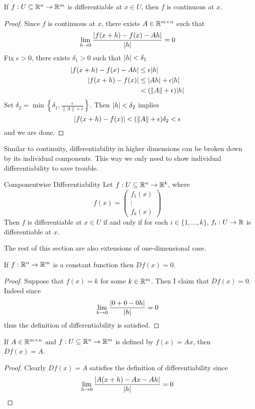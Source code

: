 \documentclass[a4paper]{article}
\begin{document}
\begin{prp}{}{} If $f:U\subseteq\mathbb{R}^n\to\mathbb{R}^m$ is differentiable at $x\in U$, then $f$ is continuous at $x$. \tcbline
\begin{proof}
Since $f$ is continuous at $x$, there exists $A\in\mathbb{R}^{m\times n}$ such that $$\lim_{h\to 0}\frac{\abs{f(x+h)-f(x)-Ah}}{\abs{h}}=0$$ Fix $\epsilon>0$, there exists $\delta_1>0$ such that $\abs{h}<\delta_1$ 
\begin{align*}
\abs{f(x+h)-f(x)-Ah}&\leq\epsilon\abs{h}\\
\abs{f(x+h)-f(x)}&\leq\abs{Ah}+\epsilon\abs{h}\\
&<(\|A\|+\epsilon)\abs{h}
\end{align*}
Set $\delta_2=\min\left\{\delta_1,\frac{\epsilon}{\|A\|+\epsilon}\right\}$. Then $\abs{h}<\delta_2$ implies $$\abs{f(x+h)-f(x)}<(\|A\|+\epsilon)\delta_2<\epsilon$$ and we are done. 
\end{proof}
\end{prp}

Similar to continuity, differentiability in higher dimensions can be broken down by its individual components. This way we only need to show individual differentiability to save trouble. 

\begin{prp}{Componentwise Differentiability}{} Let $f:U\subseteq\mathbb{R}^n\to\mathbb{R}^k$, where $$f(x)=\begin{pmatrix}f_1(x)\\\vdots\\f_k(x)\end{pmatrix}$$ Then $f$ is differentiable at $x\in U$ if and only if for each $i\in\{1,\dots,k\}$, $f_i:U\to\mathbb{R}$ is differentiable at $x$. 
\end{prp}

The rest of this section are also extensions of one-dimensional case. 

\begin{prp}{}{} If $f:\mathbb{R}^n\to\mathbb{R}^m$ is a constant function then $Df(x)=0$. \tcbline
\begin{proof}
Suppose that $f(x)=k$ for some $k\in\mathbb{R}^m$. Then I claim that $Df(x)=0$. Indeed since $$\lim_{h\to 0}\frac{\abs{0+0-0h}}{\abs{h}}=0$$ thus the definition of differentiability is satisfied. 
\end{proof}
\end{prp}

\begin{prp}{}{} If $A\in\mathbb{R}^{m\times n}$ and $f:U\subseteq\mathbb{R}^n\to\mathbb{R}^m$ is defined by $f(x)=Ax$, then $Df(x)=A$. \tcbline
\begin{proof}
Clearly $Df(x)=A$ satisfies the definition of differentiability since $$\lim_{h\to 0}\frac{\abs{A(x+h)-Ax-Ah}}{\abs{h}}=0$$
\end{proof}
\end{prp}
\end{document}
